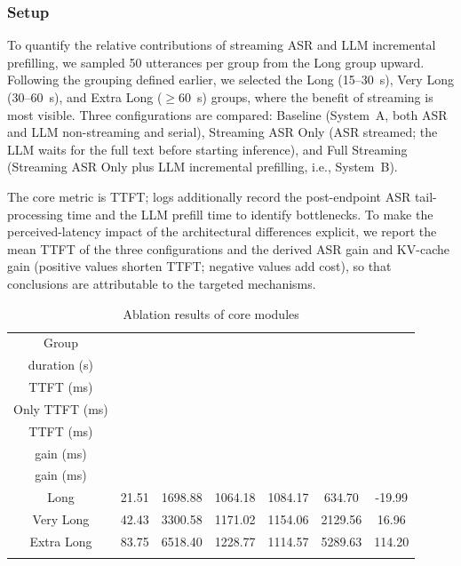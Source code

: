 \documentclass[pdflatex,iicol,Numbered,sn-basic]{sn-jnl}%
\begin{document}
\subsubsection{Setup}

To quantify the relative contributions of streaming ASR and LLM incremental prefilling, we sampled 50 utterances per group from the Long group upward. Following the grouping defined earlier, we selected the Long (15--30~s), Very Long (30--60~s), and Extra Long ($\geq$60~s) groups, where the benefit of streaming is most visible. Three configurations are compared: Baseline (System~A, both ASR and LLM non-streaming and serial), Streaming ASR Only (ASR streamed; the LLM waits for the full text before starting inference), and Full Streaming (Streaming ASR Only plus LLM incremental prefilling, i.e., System~B).

The core metric is TTFT; logs additionally record the post-endpoint ASR tail-processing time and the LLM prefill time to identify bottlenecks. To make the perceived-latency impact of the architectural differences explicit, we report the mean TTFT of the three configurations and the derived ASR gain and KV-cache gain (positive values shorten TTFT; negative values add cost), so that conclusions are attributable to the targeted mechanisms.

\begin{table}[htbp]
\caption{Ablation results of core modules}\label{tab:ablation}
\small
\begin{tabular*}{\textwidth}{@{\extracolsep\fill}ccccccc}
\toprule
Group & \begin{tabular}[c]{@{}c@{}}Mean\\duration (s)\end{tabular} & \begin{tabular}[c]{@{}c@{}}Baseline\\TTFT (ms)\end{tabular} & \begin{tabular}[c]{@{}c@{}}Streaming ASR\\Only TTFT (ms)\end{tabular} & \begin{tabular}[c]{@{}c@{}}Full Streaming\\TTFT (ms)\end{tabular} & \begin{tabular}[c]{@{}c@{}}ASR\\gain (ms)\end{tabular} & \begin{tabular}[c]{@{}c@{}}KV Cache\\gain (ms)\end{tabular} \\
\midrule
Long & 21.51 & 1698.88 & 1064.18 & 1084.17 & 634.70 & -19.99 \\
Very Long & 42.43 & 3300.58 & 1171.02 & 1154.06 & 2129.56 & 16.96 \\
Extra Long & 83.75 & 6518.40 & 1228.77 & 1114.57 & 5289.63 & 114.20 \\
\botrule
\end{tabular*}
\end{table}
\end{document}
